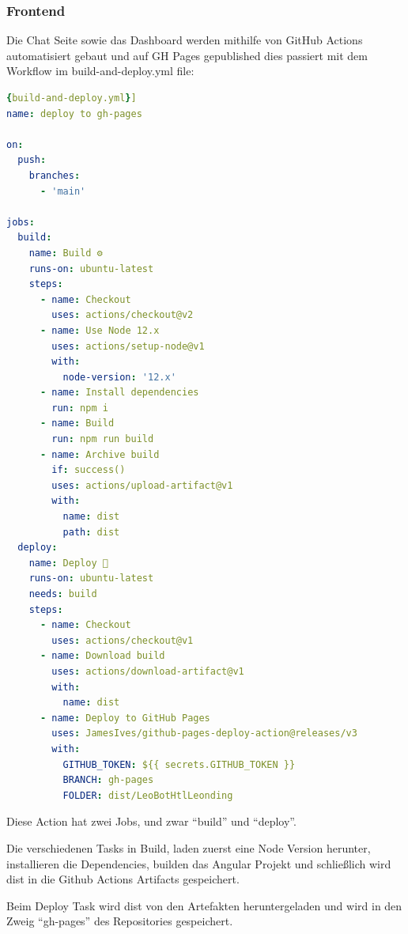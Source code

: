 \subsubsection{Frontend}
Die Chat Seite sowie das Dashboard werden mithilfe von GitHub Actions automatisiert gebaut und auf GH Pages gepublished dies passiert mit dem Workflow im build-and-deploy.yml file:

\begin{lstlisting}[language=yaml,label={lst:buildanddeployyml},caption={build-and-deploy.yml}]{build-and-deploy.yml}]
name: deploy to gh-pages

on:
  push:
    branches:
      - 'main'

jobs:
  build:
    name: Build ⚙
    runs-on: ubuntu-latest
    steps:
      - name: Checkout
        uses: actions/checkout@v2
      - name: Use Node 12.x
        uses: actions/setup-node@v1
        with:
          node-version: '12.x'
      - name: Install dependencies
        run: npm i
      - name: Build
        run: npm run build
      - name: Archive build
        if: success()
        uses: actions/upload-artifact@v1
        with:
          name: dist
          path: dist
  deploy:
    name: Deploy 🚀
    runs-on: ubuntu-latest
    needs: build
    steps:
      - name: Checkout
        uses: actions/checkout@v1
      - name: Download build
        uses: actions/download-artifact@v1
        with:
          name: dist
      - name: Deploy to GitHub Pages
        uses: JamesIves/github-pages-deploy-action@releases/v3
        with:
          GITHUB_TOKEN: ${{ secrets.GITHUB_TOKEN }}
          BRANCH: gh-pages
          FOLDER: dist/LeoBotHtlLeonding
\end{lstlisting}

Diese Action hat zwei Jobs, und zwar ``build'' und ``deploy''.

Die verschiedenen Tasks in Build, laden zuerst eine Node Version herunter, installieren die Dependencies, builden das Angular Projekt und schließlich wird dist in die Github Actions Artifacts gespeichert.

Beim Deploy Task wird dist von den Artefakten  heruntergeladen und wird in den Zweig ``gh-pages'' des Repositories gespeichert.
